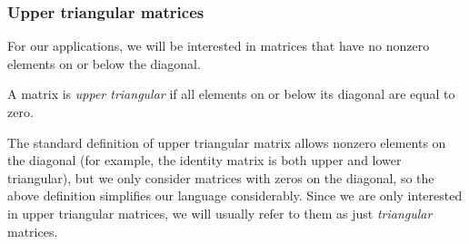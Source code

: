 \subsubsection{Upper triangular matrices}
For our applications, we will be interested in matrices that have no nonzero elements on or below the diagonal.
\begin{Definition}
  A matrix is \emph{upper triangular} if all elements on or below its diagonal are equal to zero.
\end{Definition}
The standard definition of upper triangular matrix allows nonzero elements on the diagonal (for example, the identity matrix is both upper and lower triangular), but we only consider matrices with zeros on the diagonal, so the above definition simplifies our language considerably.
Since we are only interested in upper triangular matrices, we will usually refer to them as just \emph{triangular} matrices.
